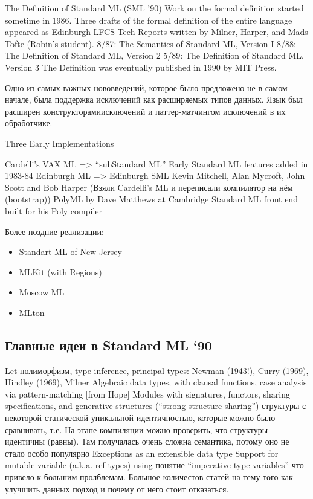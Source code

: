\documentclass[14pt]{matmex-diploma-custom}
\begin{document}
The Definition of Standard ML (SML ’90)
Work on the formal definition started sometime in 1986. Three drafts of
the formal definition of the entire language appeared as Edinburgh LFCS
Tech Reports written by Milner, Harper, and Mads Tofte (Robin’s student).
8/87: The Semantics of Standard ML, Version I
8/88: The Definition of Standard ML, Version 2
5/89: The Definition of Standard ML, Version 3
The Definition was eventually published in 1990 by MIT Press.

Одно из самых важных нововведений, которое было предложено не в самом начале, была поддержка исключений как расширяемых типов данных. Язык был расширен конструкторамиисключений и паттер-матчингом исключений в их обработчике. 

Three Early Implementations

Cardelli’s VAX ML => “subStandard ML”
Early Standard ML features added in 1983-84
Edinburgh ML => Edinburgh SML
Kevin Mitchell, Alan Mycroft, John Scott and Bob Harper (Взяли Cardelli’s ML и переписали компилятор на нём (bootstrap))
PolyML by Dave Matthews at Cambridge
Standard ML front end built for his Poly compiler

Более поздние реализации:
\begin{itemize}
 \item Standart ML of New Jersey
 \item MLKit (with Regions)
 \item Moscow ML
 \item MLton
\end{itemize}

\subsection{ Главные идеи в  Standard ML ‘90}
Let-полиморфизм, type inference, principal types: Newman (1943!), Curry (1969), Hindley (1969), Milner
Algebraic data types, with clausal functions, case analysis via pattern-matching [from Hope]
Modules with signatures, functors, sharing specifications, and generative structures (“strong structure sharing”) структуры  с  некоторой статической уникальной идентичностью, которые  можно было сравнивать, т.е. На этапе компиляции можно проверить, что структуры идентичны (равны). Там получалась очень сложна семантика, потому оно не стало особо популярно
Exceptions as an extensible data type
Support for mutable variable (a.k.a. ref types) using понятие “imperative type variables” что привело к большим пролблемам. Большое количестов статей на тему того как улучшить данных подход и почему от него стоит отказаться.
\end{document}
